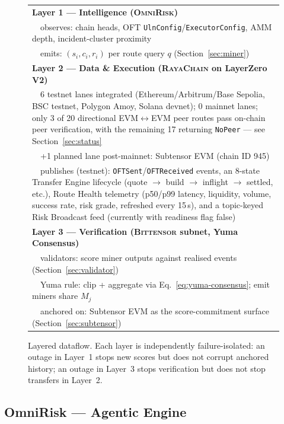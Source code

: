 \documentclass[11pt,a4paper]{article}
\begin{document}
\begin{figure}[h]
\centering
\begin{small}
\begin{tabular}{l}
\toprule
\textbf{Layer 1 --- Intelligence (\textsc{OmniRisk})} \\
~~observes: chain heads, OFT \texttt{UlnConfig}/\texttt{ExecutorConfig}, AMM depth,
incident-cluster proximity \\
~~emits: $(s_i, c_i, r_i)$ per route query $q$ (Section~\ref{sec:miner}) \\
\midrule
\textbf{Layer 2 --- Data \& Execution (\textsc{RayaChain} on LayerZero V2)} \\
~~6 testnet lanes integrated (Ethereum/Arbitrum/Base Sepolia, BSC testnet,
Polygon Amoy, Solana devnet); 0 mainnet lanes; only 3 of 20 directional
EVM$\leftrightarrow$EVM peer routes pass on-chain peer verification, with the
remaining 17 returning \texttt{NoPeer} --- see Section~\ref{sec:status} \\
~~+1 planned lane post-mainnet: Subtensor EVM (chain ID 945) \\
~~publishes (testnet): \texttt{OFTSent}/\texttt{OFTReceived} events, an 8-state
Transfer Engine lifecycle (quote $\to$ build $\to$ inflight $\to$ settled, etc.),
Route Health telemetry (p50/p99 latency, liquidity, volume, success rate, risk
grade, refreshed every 15\,s), and a topic-keyed Risk Broadcast feed
(currently with readiness flag false) \\
\midrule
\textbf{Layer 3 --- Verification (\textsc{Bittensor} subnet, Yuma Consensus)} \\
~~validators: score miner outputs against realised events (Section~\ref{sec:validator}) \\
~~Yuma rule: clip + aggregate via Eq.~\eqref{eq:yuma-consensus};
emit miners share $M_j$ \\
~~anchored on: Subtensor EVM as the score-commitment surface
(Section~\ref{sec:subtensor}) \\
\bottomrule
\end{tabular}
\end{small}
\caption{Layered dataflow. Each layer is independently failure-isolated: an outage in
Layer~1 stops new scores but does not corrupt anchored history; an outage in Layer~3
stops verification but does not stop transfers in Layer~2.}
\label{fig:arch-text}
\end{figure}

\subsection{OmniRisk --- Agentic Engine}\label{sec:arch:omnirisk}
\end{document}
